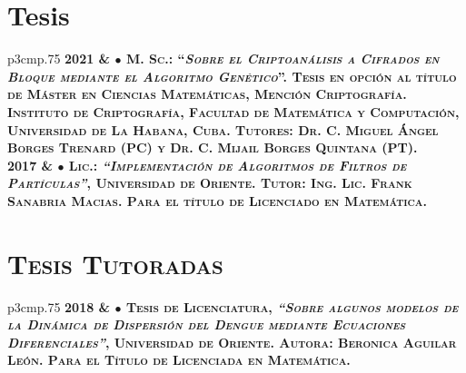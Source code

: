 
\section{{Tesis}}

\begin{tabular}{p{3cm}p{.75\linewidth}}
\hfill\bfseries\scshape 2021 & $\bullet$ \textbf{M. Sc.:} ``\textit{Sobre el Criptoan\'alisis a Cifrados en Bloque mediante el Algoritmo Gen\'etico}''. Tesis en opci\'on al t\'itulo de \textbf{M\'aster en Ciencias Matem\'aticas}, Menci\'on Criptograf\'ia. Instituto de Criptograf\'ia, Facultad de Matem\'atica y Computaci\'on, Universidad de La Habana, Cuba. Tutores: Dr. C. Miguel \'Angel Borges Trenard (PC) y Dr. C. Mijail Borges Quintana (PT).\\
\hfill\bfseries\scshape 2017 & $\bullet$ \textbf{Lic.:} \textit{``Implementaci\'on de Algoritmos de Filtros de Part\'iculas''}, Universidad de Oriente. Tutor: Ing. Lic. Frank Sanabria Macias. Para el t\'itulo de \textbf{Licenciado en Matem\'atica}.
\end{tabular}

\section{\textsc{Tesis Tutoradas}}

\begin{tabular}{p{3cm}p{.75\linewidth}}
\hfill\bfseries\scshape 2018 & $\bullet$ Tesis de Licenciatura, \textit{``Sobre algunos modelos de la Din\'amica de Dispersi\'on del Dengue} \textit{mediante Ecuaciones Diferenciales''}, Universidad de Oriente. Autora: Beronica Aguilar Le\'on.  Para el T\'itulo de Licenciada en Matem\'atica.
\end{tabular}